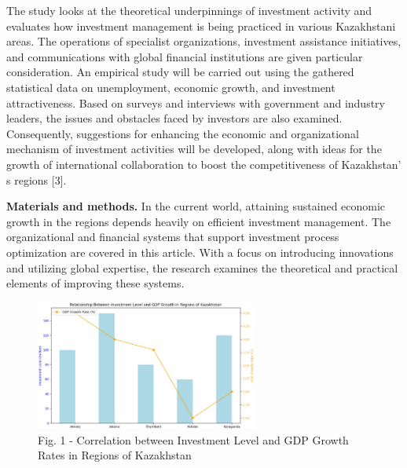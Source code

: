 \begin{multicols}{2}
The study looks at the theoretical underpinnings of investment activity
and evaluates how investment management is being practiced in various
Kazakhstani areas. The operations of specialist organizations,
investment assistance initiatives, and communications with global
financial institutions are given particular consideration. An empirical
study will be carried out using the gathered statistical data on
unemployment, economic growth, and investment attractiveness. Based on
surveys and interviews with government and industry leaders, the issues
and obstacles faced by investors are also examined. Consequently,
suggestions for enhancing the economic and organizational mechanism of
investment activities will be developed, along with ideas for the growth
of international collaboration to boost the competitiveness of
Kazakhstan' s regions {[}3{]}.

{\bfseries Materials and methods.} In the current world, attaining
sustained economic growth in the regions depends heavily on efficient
investment management. The organizational and financial systems that
support investment process optimization are covered in this article.
With a focus on introducing innovations and utilizing global expertise,
the research examines the theoretical and practical elements of
improving these systems.
\end{multicols}

\begin{figure}[H]
	\centering
	\includegraphics[width=0.65\textwidth]{media/ekon/image3}
	\caption*{Fig. 1 - Correlation between Investment Level and GDP Growth Rates in Regions of Kazakhstan}
\end{figure}

